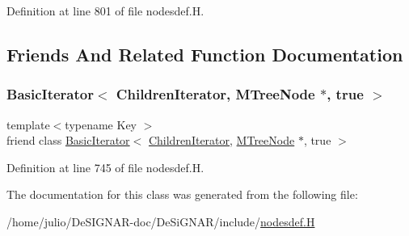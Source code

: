 Definition at line 801 of file nodesdef.\+H.



\subsection{Friends And Related Function Documentation}
\mbox{\label{class_designar_1_1_m_tree_node_1_1_children_iterator_a9318ecb15aa59102557883ca0b98fea5}} 
\subsubsection{\texorpdfstring{Basic\+Iterator$<$ Children\+Iterator, M\+Tree\+Node $\ast$, true $>$}{BasicIterator< ChildrenIterator, MTreeNode *, true >}}
{\footnotesize\ttfamily template$<$typename Key $>$ \\
friend class \hyperlink{class_designar_1_1_basic_iterator}{Basic\+Iterator}$<$ \hyperlink{class_designar_1_1_m_tree_node_1_1_children_iterator}{Children\+Iterator}, \hyperlink{class_designar_1_1_m_tree_node}{M\+Tree\+Node} $\ast$, true $>$\hspace{0.3cm}{\ttfamily [friend]}}



Definition at line 745 of file nodesdef.\+H.



The documentation for this class was generated from the following file\+:\begin{DoxyCompactItemize}
\item 
/home/julio/\+De\+S\+I\+G\+N\+A\+R-\/doc/\+De\+Si\+G\+N\+A\+R/include/\hyperlink{nodesdef_8_h}{nodesdef.\+H}\end{DoxyCompactItemize}
